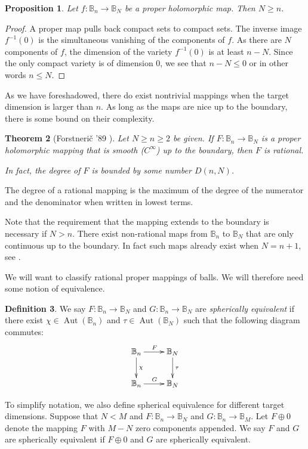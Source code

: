 \documentclass[12pt,openany]{book}
\newcommand{\Aut}{\operatorname{Aut}}
\newcommand{\bB}{{\mathbb{B}}}
\newcommand{\myindex}[1]{#1\index{#1}}
\theoremstyle{plain}
\newtheorem{thm}{Theorem}[section]
\newtheorem{prop}[thm]{Proposition}
\theoremstyle{remark}
\theoremstyle{definition}
\newtheorem{defn}[thm]{Definition}
\theoremstyle{exercise}
\theoremstyle{example}
\begin{document}
\begin{prop}
Let $f \colon \bB_n \to \bB_N$ be a proper holomorphic map.  Then $N \geq n$.
\end{prop}

\begin{proof}
A proper map pulls back compact sets to compact sets.  The inverse image 
$f^{-1}(0)$ is the simultaneous vanishing of the components of $f$.  As
there are $N$ components of $f$, the dimension of the variety $f^{-1}(0)$
is at least $n-N$.  Since the only compact variety is of dimension 0, we see
that $n-N \leq 0$ or in other words $n \leq N$.
\end{proof}

As we have foreshadowed, there do exist nontrivial 
mappings when the target dimension is larger than $n$.  As long as the maps
are nice up to the boundary, there is some bound on their complexity.

\begin{thm}[Forstneri{\v c} '89 \cite{Forstneric89}]
Let $N \geq n \geq 2$ be given.
If $F \colon \bB_n \to \bB_N$ is a proper holomorphic
mapping that is smooth ($C^\infty$)
up to the boundary, then $F$ is rational.

In fact, the degree of $F$ is bounded by some number
$D(n,N)$.
\end{thm}

The degree of a rational mapping is the maximum of the degree of the
numerator and the denominator when written in lowest terms.

Note that the requirement that the mapping extends to the boundary is
necessary if $N > n$.
There exist non-rational maps from $\bB_n$ to $\bB_N$ that
are only continuous up to the boundary.
In fact such maps already exist when $N=n+1$, see \cite{Dor}.

We will want to classify rational proper mappings of balls.  We will
therefore need some notion of equivalence.

\begin{defn}
We say
$F \colon \bB_n \to \bB_N$ and
$G \colon \bB_n \to \bB_N$ are \emph{\myindex{spherically equivalent}} if
there exist 
$\chi \in \Aut(\bB_n)$ and 
$\tau \in \Aut(\bB_N)$ such that the following diagram commutes:
\begin{equation}
\xymatrix{
\bB_n \ar[d]^{\chi} \ar[r]^F & \bB_N \ar[d]^{\tau} \\
\bB_n \ar[r]^G          & \bB_N }
\end{equation}

To simplify notation, we also define spherical equivalence for different
target dimensions.
Suppose that $N < M$ and 
$F \colon \bB_n \to \bB_N$ and
$G \colon \bB_n \to \bB_M$.  Let $F \oplus 0$ denote the mapping $F$
with $M-N$ zero components appended.  We say $F$ and $G$
are spherically equivalent if $F \oplus 0$ and $G$ are spherically
equivalent.
\end{defn}
\end{document}
